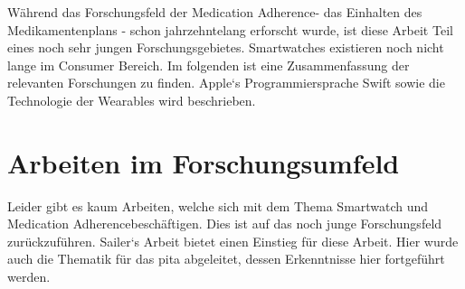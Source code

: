 

Während das Forschungsfeld der \glqq Medication Adherence\grqq - das Einhalten des Medikamentenplans - schon jahrzehntelang erforscht wurde, ist diese Arbeit Teil eines noch sehr jungen Forschungsgebietes. Smartwatches existieren noch nicht lange im Consumer Bereich. Im folgenden ist eine Zusammenfassung der relevanten Forschungen zu finden. Apple`s Programmiersprache Swift sowie die Technologie der Wearables wird beschrieben.
\section{Arbeiten im Forschungsumfeld}
Leider gibt es kaum Arbeiten, welche sich mit dem Thema Smartwatch und \glqq Medication Adherence\grqq   beschäftigen. Dies ist auf das noch junge Forschungsfeld zurückzuführen. Sailer`s Arbeit \cite{Fabian-Sailer:2015aa} bietet einen Einstieg für diese Arbeit. Hier wurde auch die Thematik für das \gls{pita} abgeleitet, dessen Erkenntnisse hier fortgeführt werden. 

